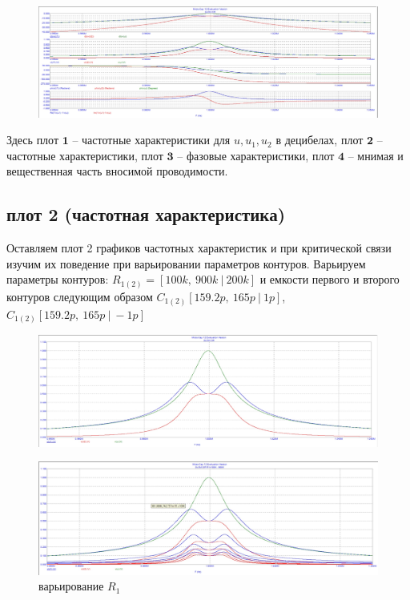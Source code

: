 \documentclass[a4paper, 14pt]{extarticle}%
\begin{document}
\begin{figure}[h!]
	\centering
			\includegraphics[width=1.1\linewidth]{1.1.jpg}
	\label{A}
\end{figure}

Здесь $\textbf{плот 1}$ -- частотные характеристики для $u, u_1, u_2$ в децибелах, $\textbf{плот 2}$ -- частотные характеристики, $\textbf{плот 3}$ -- фазовые характеристики, $\textbf{плот 4}$ -- мнимая и вещественная часть вносимой проводимости.


\subsection{плот 2 (частотная характеристика)}

Оставляем плот 2 графиков частотных характеристик и при критической связи изучим их поведение при варьировании параметров контуров.
\newline
Варьируем параметры контуров:
\newline
$R_{1(2)} = [100k,  \: 900k \:| \: 200k]$ и емкости первого и второго контуров следующим образом $C_{1(2)} [159.2p, \: 165p \: | \: 1p]$, $C_{1(2)} [159.2p, \: 165p \: | \: -1p]$

\begin{figure}[h!]
	\centering
			\includegraphics[width=1.1\linewidth]{1.2.jpg}
	\label{A}
\end{figure}

\begin{figure}[h!]
	\centering
			\includegraphics[width=1.1\linewidth]{1.2_varR1.jpg}
            \caption{варьирование $R_1$}
	\label{A}
\end{figure}
\end{document}
